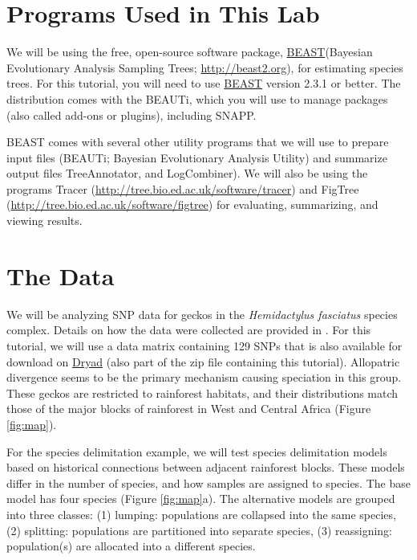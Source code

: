 \documentclass{article}
\newcommand{\program}[1]{#1\xspace}
\newcommand{\beast}{\href{http://beast2.org}{\program{BEAST}}\xspace}
\begin{document}
\section{Programs Used in This Lab}
We will be using the free, open-source software package, \beast (Bayesian
Evolutionary Analysis Sampling Trees;
\href{http://beast2.org}{\url{http://beast2.org}}), for
estimating species trees.
For this tutorial, you will need to use \beast version 2.3.1 or better. 
The distribution comes with the \program{BEAUTi}, which you will use to manage packages (also called add-ons or plugins), including \program{SNAPP}.

\program{BEAST} comes with several other utility programs that we will use to prepare 
input files (\program{BEAUTi}; Bayesian Evolutionary Analysis
Utility) and summarize output files \program{TreeAnnotator}, and \program{LogCombiner}).
We will also be using the programs \program{Tracer}
(\href{http://tree.bio.ed.ac.uk/software/tracer}{\url{http://tree.bio.ed.ac.uk/software/tracer}})
and \program{FigTree}
(\href{http://tree.bio.ed.ac.uk/software/figtree}{\url{http://tree.bio.ed.ac.uk/software/figtree}})
for evaluating, summarizing, and viewing results.

\section{The Data}
We will be analyzing SNP data for geckos in the \textit{Hemidactylus fasciatus} species complex. Details on how the data were collected are 
provided in \citep{Leache14}. For this tutorial, we will use a data matrix containing 129 SNPs that is also available for download on \href{http://datadryad.org/resource/doi:10.5061/dryad.r55fb}{Dryad} (also part of the zip file containing this tutorial). Allopatric divergence seems to be the primary mechanism causing speciation in this group. These geckos are restricted to rainforest habitats, and their distributions match those of the major blocks of rainforest in West and Central Africa (Figure \ref{fig:map}). 

For the species delimitation example, we will test species delimitation models based on historical connections between adjacent rainforest blocks. These models differ in the number of species, and how samples are assigned to species. The base model has four species (Figure \ref{fig:map}a). The alternative models are grouped into three classes: (1) lumping: populations are collapsed into the same species, (2) splitting: populations are partitioned into separate species, (3) reassigning: population(s) are allocated into a different species.
\end{document}
